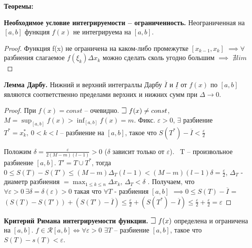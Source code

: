 \bigbreak
\textbf{Теоремы:}

\textbf{Необходимое условие интегрируемости -- ограниченность.} Неограниченная на $[a, b]$ функция $f(x)$ не интегрируема на $[a, b]$.

\begin{proof}
Функция f(x) не ограничена на каком-либо промежутке $[x_{k-1}, x_k]$ $\implies \forall$ разбиения слагаемое $f(\xi_k)\Delta x_k$ можно сделать сколь угодно большим $\implies$ $\nexists lim$
\end{proof}

\bigbreak
\textbf{Лемма Дарбу.} Нижний и верхний интеграллы Дарбу $\overline{I}$ и $\underline{I}$ от $f(x)$ по $[a, b]$ являются соответственно пределами верхних и нижних сумм при $\Delta \to 0$.

\begin{proof}
При $f(x) = const$ -- очевидно. $\mathLet ~ f(x) \neq const$, $M = \sup_{[a, b]}f(x) > \inf_{[a,b]}f(x) = m$. 
Фикс. $\varepsilon > 0$, $\exists$ разбиение $T^* = {x_k^*}, ~ 0<k<l$ -- разбиение на $[a, b]$, такое что $S(T^*) - \overline{I} < \frac{\varepsilon}{2}$

Положим $\delta = \frac{\varepsilon}{2(M - m)(l - 1)} > 0 $ ($\delta$ зависит только от $\varepsilon$). 
\mathLet \ T -- произвольное разбиение $[a, b]$. $T' = T \cup T^*$, тогда $0 \leq S(T) - S(T') \leq (M - m)\Delta_T(l-1) < (M - m)(l - 1)\delta = \frac{\varepsilon}{2}$, $\Delta_T$ - диаметр разбиения $ = \max_{1\leq k \leq n}\Delta x_k$, $\Delta_T < \delta$ .
Получаем, что $\forall\varepsilon > 0  ~ \exists\delta=\delta(\varepsilon) > 0$ такая что $\forall T$ - разбиения $[a, b]$ 
$\implies 0 \leq S(T) - \overline{I}$ = $(S(T) - S(T')) + (S(T') - \overline{I}) \leq \frac{\varepsilon}{2} + (S(T^*) - \overline{I}) \leq \frac{\varepsilon}{2} + \frac{\varepsilon}{2} = \varepsilon$
\end{proof}

\bigbreak
\textbf{Критерий Римана интегрируемости функции.} $\mathLet ~ f(x)$ определена и ограничена на $[a,b]$. $f\in \mathcal{R}[a, b] \iff \forall \varepsilon > 0$ $\exists T$ -- разбиение $[a, b]$, такое что $S(T) - s(T) < \varepsilon$.

